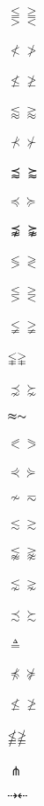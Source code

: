 \documentclass{article}
\begin{document}
$\lesseqqgtr \gtreqqless $\\\\
$\nless \ngtr $\\\\
$\nleq \ngeq $\\\\
$\lessapprox \gtrapprox $\\\\
$\nprec \nsucc $\\\\
$\precapprox \succapprox $\\\\
$\preccurlyeq \succcurlyeq $\\\\
$\precnapprox \succnapprox $\\\\
$\lessgtr \gtrless $\\\\
$\lesseqgtr \gtreqless $\\\\
$\lneqq \gneqq $\\\\
$\lvertneqq \gvertneqq $\\\\
$\precnsim \succnsim $\\\\
$\thickapprox \thicksim$\\\\
$\eqslantless \eqslantgtr $\\\\
$\curlyeqprec \curlyeqsucc $\\\\
$\nsim \eqsim $\\\\
$\lesssim \gtrsim $\\\\
$\lnapprox \gnapprox $\\\\
$\lnsim \gnsim $\\\\
$\precsim \succsim $\\\\
$\triangleq $\\\\
$\npreceq \nsucceq $\\\\
$\nleqslant \ngeqslant $\\\\
$\nleqq \ngeqq $\\\\
$\pitchfork$\\\\
$\dashrightarrow \dashleftarrow$\\\\
\end{document}
